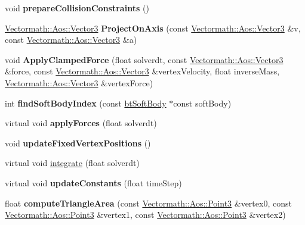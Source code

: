 \begin{DoxyCompactItemize}
void {\bfseries prepare\+Collision\+Constraints} ()
\item 
\mbox{\label{classbtOpenCLSoftBodySolver_a3a0f578011b93e94ac43a86387585a13}} 
\hyperlink{classVectormath_1_1Aos_1_1Vector3}{Vectormath\+::\+Aos\+::\+Vector3} {\bfseries Project\+On\+Axis} (const \hyperlink{classVectormath_1_1Aos_1_1Vector3}{Vectormath\+::\+Aos\+::\+Vector3} \&v, const \hyperlink{classVectormath_1_1Aos_1_1Vector3}{Vectormath\+::\+Aos\+::\+Vector3} \&a)
\item 
\mbox{\label{classbtOpenCLSoftBodySolver_acc300cbf275db4285f6337552f41a0b9}} 
void {\bfseries Apply\+Clamped\+Force} (float solverdt, const \hyperlink{classVectormath_1_1Aos_1_1Vector3}{Vectormath\+::\+Aos\+::\+Vector3} \&force, const \hyperlink{classVectormath_1_1Aos_1_1Vector3}{Vectormath\+::\+Aos\+::\+Vector3} \&vertex\+Velocity, float inverse\+Mass, \hyperlink{classVectormath_1_1Aos_1_1Vector3}{Vectormath\+::\+Aos\+::\+Vector3} \&vertex\+Force)
\item 
\mbox{\label{classbtOpenCLSoftBodySolver_ab9279cc2d59f750669cfdb1169cfd72d}} 
int {\bfseries find\+Soft\+Body\+Index} (const \hyperlink{classbtSoftBody}{bt\+Soft\+Body} $\ast$const soft\+Body)
\item 
\mbox{\label{classbtOpenCLSoftBodySolver_a8324ecdd34d33f9fb7ece1e6062f6dbc}} 
virtual void {\bfseries apply\+Forces} (float solverdt)
\item 
\mbox{\label{classbtOpenCLSoftBodySolver_a8ebe65eba18e313891c8b7d9894f1a07}} 
void {\bfseries update\+Fixed\+Vertex\+Positions} ()
\item 
virtual void \hyperlink{classbtOpenCLSoftBodySolver_aa2a458178afe9043500b191deb0dce97}{integrate} (float solverdt)
\item 
\mbox{\label{classbtOpenCLSoftBodySolver_afc0a46de81d20e4b7b58928bf8f99fa4}} 
virtual void {\bfseries update\+Constants} (float time\+Step)
\item 
\mbox{\label{classbtOpenCLSoftBodySolver_af5a6006337ca96e942876b52be7b7763}} 
float {\bfseries compute\+Triangle\+Area} (const \hyperlink{classVectormath_1_1Aos_1_1Point3}{Vectormath\+::\+Aos\+::\+Point3} \&vertex0, const \hyperlink{classVectormath_1_1Aos_1_1Point3}{Vectormath\+::\+Aos\+::\+Point3} \&vertex1, const \hyperlink{classVectormath_1_1Aos_1_1Point3}{Vectormath\+::\+Aos\+::\+Point3} \&vertex2)

\end{DoxyCompactItemize}
